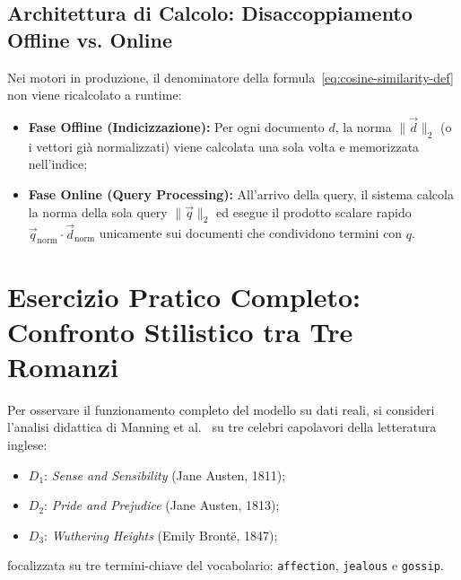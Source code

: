 \FloatBarrier
\subsection{Architettura di Calcolo: Disaccoppiamento Offline vs. Online}
\label{subsec:disaccoppiamento-calcolo-coseno}

Nei motori in produzione, il denominatore della formula~\eqref{eq:cosine-similarity-def} non viene ricalcolato a runtime:
\begin{itemize}
    \item \textbf{Fase Offline (Indicizzazione):} Per ogni documento $d$, la norma $\|\vec{d}\|_2$ (o i vettori gi\`a normalizzati) viene calcolata una sola volta e memorizzata nell'indice;
    \item \textbf{Fase Online (Query Processing):} All'arrivo della query, il sistema calcola la norma della sola query $\|\vec{q}\|_2$ ed esegue il prodotto scalare rapido $\vec{q}_{\text{norm}} \cdot \vec{d}_{\text{norm}}$ unicamente sui documenti che condividono termini con $q$.
\end{itemize}

\FloatBarrier
\section{Esercizio Pratico Completo: Confronto Stilistico tra Tre Romanzi}
\label{sec:esercizio-tre-romanzi}

Per osservare il funzionamento completo del modello su dati reali, si consideri l'analisi didattica di Manning et al.~\cite{manning2008} su tre celebri capolavori della letteratura inglese:
\begin{itemize}
    \item $D_1$: \textit{Sense and Sensibility} (Jane Austen, 1811);
    \item $D_2$: \textit{Pride and Prejudice} (Jane Austen, 1813);
    \item $D_3$: \textit{Wuthering Heights} (Emily Bront\"e, 1847);
\end{itemize}
focalizzata su tre termini-chiave del vocabolario: \texttt{affection}, \texttt{jealous} e \texttt{gossip}.

\begin{table}[H]
\centering
\small
{}
\caption{Frequenze grezze assolute ($\text{tf}_{\text{raw}}$) nei tre romanzi.}
\label{tab:novels-raw}
\end{table}

